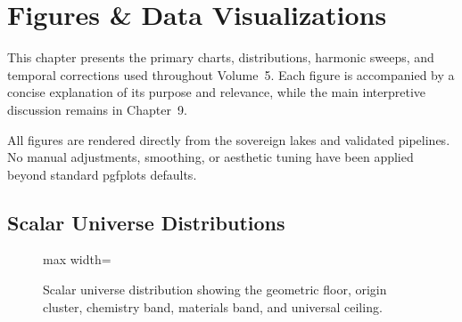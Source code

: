 \documentclass[11pt, letterpaper, openany]{book}
\begin{document}
\chapter{Figures \& Data Visualizations}

This chapter presents the primary charts, distributions, harmonic sweeps, and
temporal corrections used throughout Volume~5. Each figure is accompanied by a
concise explanation of its purpose and relevance, while the main interpretive
discussion remains in Chapter~9.

All figures are rendered directly from the sovereign lakes and validated
pipelines. No manual adjustments, smoothing, or aesthetic tuning have been
applied beyond standard pgfplots defaults.

\clearpage

\section{Scalar Universe Distributions}

\begin{figure}[H]
\centering
\begin{adjustbox}{max width=\textwidth}
\end{adjustbox}
\caption{Scalar universe distribution showing the geometric floor, origin cluster, chemistry band, materials band, and universal ceiling.}
\label{fig:scalar_ladder_distribution}
\end{figure}
\end{document}

